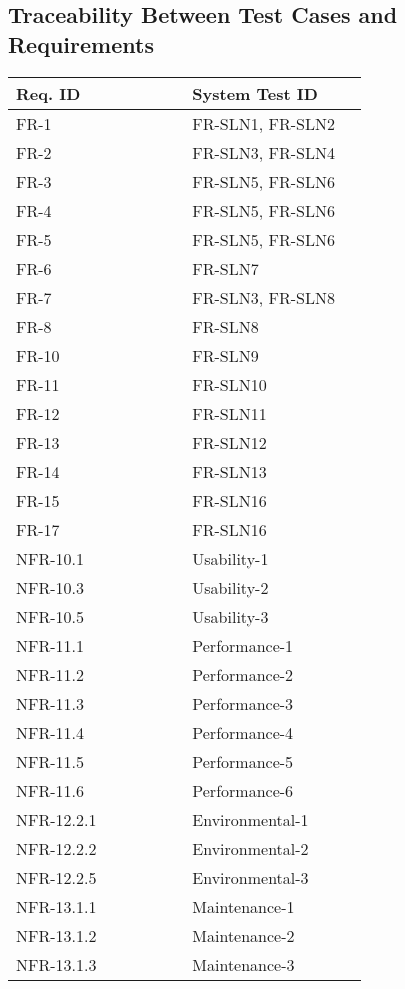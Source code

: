 \documentclass[12pt, titlepage]{article}
\begin{document}
\subsection{Traceability Between Test Cases and Requirements}

\begin{longtable}{|p{0.45\linewidth}|p{0.45\linewidth}|}
\hline
\textbf{Req. ID} & \textbf{System Test ID} \\
\hline
FR-1 & FR-SLN1, FR-SLN2 \\
\hline
FR-2 & FR-SLN3, FR-SLN4 \\
\hline
FR-3 & FR-SLN5, FR-SLN6 \\
\hline
FR-4 & FR-SLN5, FR-SLN6 \\
\hline
FR-5 & FR-SLN5, FR-SLN6 \\
\hline
FR-6 & FR-SLN7 \\
\hline
FR-7 & FR-SLN3, FR-SLN8 \\
\hline
FR-8 & FR-SLN8 \\
\hline
FR-10 & FR-SLN9 \\
\hline
FR-11 & FR-SLN10 \\
\hline
FR-12 & FR-SLN11 \\
\hline
FR-13 & FR-SLN12 \\
\hline
FR-14 & FR-SLN13 \\
\hline
FR-15 & FR-SLN16 \\
\hline
FR-17 & FR-SLN16 \\
\hline
NFR-10.1 & Usability-1  \\
\hline
NFR-10.3 & Usability-2 \\
\hline
NFR-10.5 & Usability-3 \\
\hline
NFR-11.1 & Performance-1 \\
\hline
NFR-11.2 & Performance-2 \\
\hline
NFR-11.3 & Performance-3 \\
\hline
NFR-11.4 & Performance-4 \\
\hline
NFR-11.5 & Performance-5 \\
\hline
NFR-11.6 & Performance-6 \\
\hline
NFR-12.2.1 & Environmental-1 \\
\hline
NFR-12.2.2 & Environmental-2 \\
\hline
NFR-12.2.5 & Environmental-3 \\
\hline
NFR-13.1.1 & Maintenance-1 \\
\hline
NFR-13.1.2 & Maintenance-2 \\
\hline
NFR-13.1.3 & Maintenance-3 \\

\end{longtable}
\end{document}
